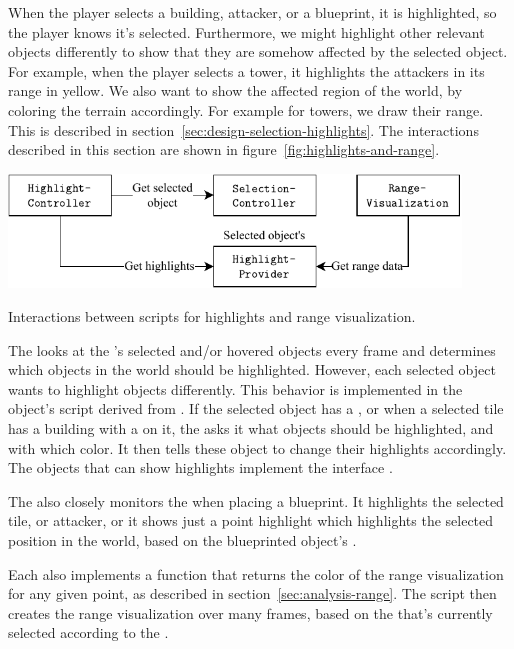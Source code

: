 When the player selects a building, attacker, or a blueprint, it is highlighted, so the player knows it's selected.
Furthermore, we might highlight other relevant objects differently to show that they are somehow affected by the selected object.
For example, when the player selects a tower, it highlights the attackers in its range in yellow.
We also want to show the affected region of the world, by coloring the terrain accordingly.
For example for towers, we draw their range.
This is described in section~\ref{sec:design-selection-highlights}.
The interactions described in this section are shown in figure~\ref{fig:highlights-and-range}.
\begin{center}
    \captionsetup{type=figure}
    \includegraphics[width=0.9\textwidth]{img/higlights and range.pdf}
    \caption{Interactions between scripts for highlights and range visualization.}
    \label{fig:highlights-and-range}
\end{center}

The  looks at the 's selected and/or hovered objects every frame and determines which objects in the world should be highlighted.
However, each selected object wants to highlight objects differently.
This behavior is implemented in the object's script derived from .
If the selected object has a , or when a selected tile has a building with a  on it, the  asks it what objects should be highlighted, and with which color.
It then tells these object to change their highlights accordingly.
The objects that can show highlights implement the interface .

The  also closely monitors the  when placing a blueprint.
It highlights the selected tile, or attacker, or it shows just a point highlight which highlights the selected position in the world, based on the blueprinted object's .

Each  also implements a function that returns the color of the range visualization for any given point, as described in section~\ref{sec:analysis-range}.
The script  then creates the range visualization over many frames, based on the  that's currently selected according to the .

